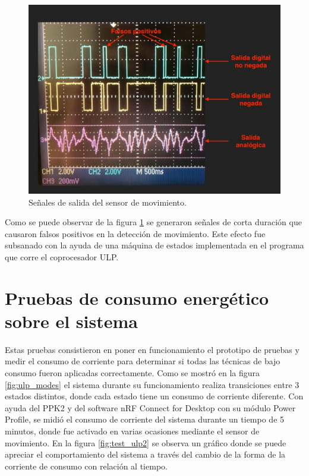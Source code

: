 \begin{figure}[h]
	\centering
	\includegraphics[scale=0.35]{./Figures/test_pir.jpeg}
	\caption{Señales de salida del sensor de movimiento.}
	\label{fig:test_pir}
\end{figure}

Como se puede observar de la figura \ref{fig:test_pir} se generaron señales de corta duración que causaron falsos positivos en la detección de movimiento. Este efecto fue subsanado con la ayuda de una máquina de estados implementada en el programa que corre el coprocesador ULP.

\section{Pruebas de consumo energético sobre el sistema}
Estas pruebas consistieron en poner en funcionamiento el prototipo de pruebas y medir el consumo de corriente para determinar si todas las técnicas de bajo consumo fueron aplicadas correctamente. Como se mostró en la figura \ref{fig:ulp_modes} el sistema durante su funcionamiento realiza transiciones entre 3 estados distintos, donde cada estado tiene un consumo de corriente diferente. Con ayuda del PPK2 y del software nRF Connect for Desktop con su módulo Power Profile, se midió el consumo de corriente del sistema durante un tiempo de 5 minutos, donde fue activado en varias ocasiones mediante el sensor de movimiento. En la figura \ref{fig:test_ulp2} se observa un gráfico donde se puede apreciar el comportamiento del sistema a través del cambio de la forma de la corriente de consumo con relación al tiempo.

